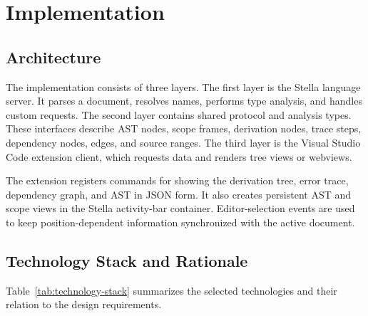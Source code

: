 ﻿\chapter{Implementation}
\label{chap:implementation}

\section{Architecture}

The implementation consists of three layers. The first layer is the Stella language server. It parses a document, resolves names, performs type analysis, and handles custom requests. The second layer contains shared protocol and analysis types. These interfaces describe AST nodes, scope frames, derivation nodes, trace steps, dependency nodes, edges, and source ranges. The third layer is the Visual Studio Code extension client, which requests data and renders tree views or webviews.

The extension registers commands for showing the derivation tree, error trace, dependency graph, and AST in JSON form. It also creates persistent AST and scope views in the Stella activity-bar container. Editor-selection events are used to keep position-dependent information synchronized with the active document.

\section{Technology Stack and Rationale}

Table~\ref{tab:technology-stack} summarizes the selected technologies and their relation to the design requirements.

